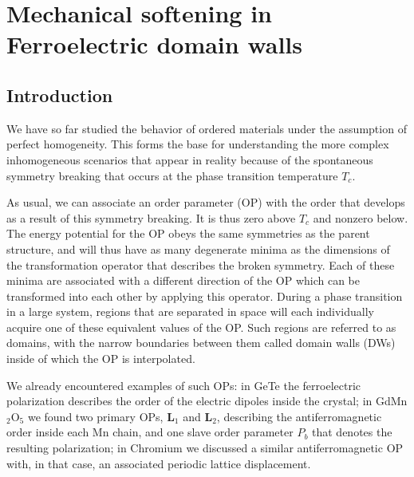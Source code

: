\chapter{Mechanical softening in Ferroelectric domain walls \label{ch:Softening}}


\section{Introduction}
We have so far studied the behavior of ordered materials under the assumption of perfect homogeneity.
This forms the base for understanding the more complex inhomogeneous scenarios that appear in reality because of the spontaneous symmetry breaking that occurs at the phase transition temperature $T_c$.

As usual, we can associate an order parameter (OP) with the order that develops as a result of this symmetry breaking. It is thus zero above $T_c$ and nonzero below.
The energy potential for the OP obeys the same symmetries as the parent structure, and will thus have as many degenerate minima as the dimensions of the transformation operator that describes the broken symmetry.
Each of these minima are associated with a different direction of the OP which can be transformed into each other by applying this operator.
During a phase transition in a large system, regions that are separated in space will each individually acquire one of these equivalent values of the OP.
Such regions are referred to as domains, with the narrow boundaries between them called domain walls (DWs) inside of which the OP is interpolated.

We already encountered examples of such OPs: in GeTe the ferroelectric polarization describes the order of the electric dipoles inside the crystal; in GdMn$_2$O$_5$ we found two primary OPs, $\bm{L}_1$ and $\bm{L}_2$, describing the antiferromagnetic order inside each Mn chain, and one slave order parameter $P_b$ that denotes the resulting polarization; in Chromium we discussed a similar antiferromagnetic OP with, in that case, an associated periodic lattice displacement.

